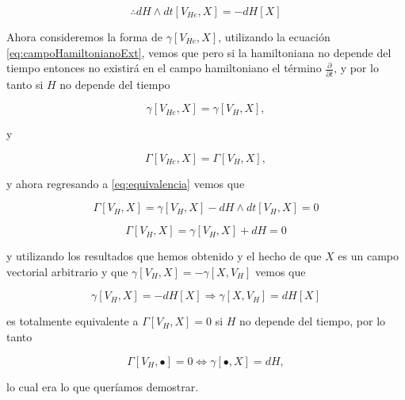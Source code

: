 \documentclass[a4paper,10pt]{article}
\numberwithin{equation}{section}
\begin{document}
\begin{equation}
 \therefore dH \wedge dt[V_{He},X] = - dH[X]
\end{equation}

Ahora consideremos la forma de $\gamma[V_{He},X]$, utilizando la ecuación \eqref{eq:campoHamiltonianoExt}, 
vemos que pero si la hamiltoniana no depende del tiempo entonces no existirá en el campo hamiltoniano el 
término $\frac{\partial}{\partial t}$, y por lo tanto si $H$ no depende 
del tiempo

\begin{equation}
 \gamma[V_{He},X] = \gamma[V_H,X],
\end{equation}

y

\begin{equation}
 \Gamma[V_{He},X] = \Gamma[V_H,X],
\end{equation}

y ahora regresando a \eqref{eq:equivalencia} vemos que 

\begin{equation}
 \Gamma[V_H,X] = \gamma[V_H,X] - dH \wedge dt[V_H,X] = 0
\end{equation}

\begin{equation}
 \Gamma[V_H,X] = \gamma[V_H,X] + dH = 0
\end{equation}

y utilizando los resultados que hemos obtenido y el hecho de que $X$ es un campo 
vectorial arbitrario y que $ \gamma[V_H,X] =  - \gamma[X,V_H]$ vemos que 

\begin{equation}
 \gamma[V_H,X] = - dH[X] \Rightarrow \gamma[X,V_H] = dH[X]
\end{equation}

es totalmente equivalente a $\Gamma[V_H,X] = 0$ si $H$ no depende del tiempo, por lo tanto 

\begin{equation}
 \Gamma[V_H,\bullet] = 0 \Leftrightarrow \gamma[\bullet,X] = dH,
\end{equation}

lo cual era lo que queríamos demostrar. 
\end{document}
